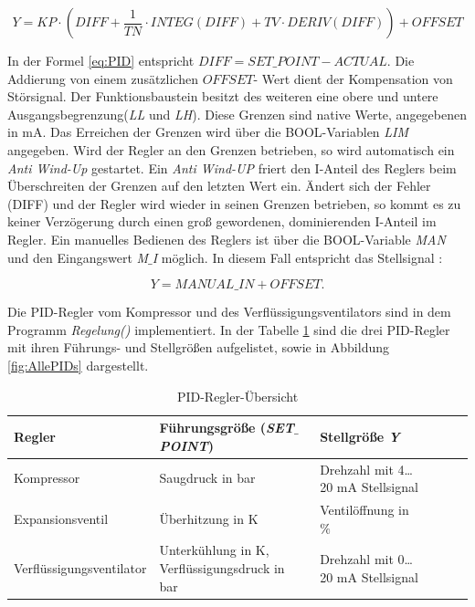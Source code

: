 \begin{equation}
 Y = KP \cdot (DIFF + \frac{1}{TN} \cdot INTEG(DIFF) + TV \cdot DERIV(DIFF)) + OFFSET
 \label{eq:PID}
\end{equation}

In der Formel \ref{eq:PID} entspricht $DIFF = SET\_POINT - ACTUAL$.  Die Addierung von einem zusätzlichen $OFFSET$- Wert dient der Kompensation von Störsignal. Der Funktionsbaustein besitzt des weiteren eine obere und untere Ausgangsbegrenzung(\textit{LL} und \textit{LH}). Diese Grenzen sind native Werte, angegebenen in mA. Das Erreichen der Grenzen wird über die BOOL-Variablen \textit{LIM} angegeben. Wird der Regler an den Grenzen betrieben, so wird automatisch ein \textit{Anti Wind-Up} gestartet. Ein \textit{Anti Wind-UP} friert den I-Anteil des Reglers beim Überschreiten der Grenzen auf den letzten Wert ein. Ändert sich der Fehler (DIFF) und der Regler wird wieder in seinen Grenzen betrieben, so kommt es zu keiner Verzögerung durch einen groß gewordenen, dominierenden I-Anteil im Regler. Ein manuelles Bedienen des Reglers ist über die BOOL-Variable \textit{MAN} und den Eingangswert \textit{M$\_$I} möglich. In diesem Fall entspricht das Stellsignal :

\begin{equation}
Y = MANUAL\_IN + OFFSET. 
\end{equation}


Die PID-Regler vom Kompressor und des Verflüssigungsventilators sind in dem Programm \textit{Regelung()} implementiert.  In der Tabelle \ref{tab:Regler_Uebersicht} sind die drei PID-Regler mit ihren Führungs- und Stellgrößen aufgelistet, sowie in Abbildung \ref{fig:AllePIDs} dargestellt. 


\begin{table}[htb]
\centering
\caption{PID-Regler-Übersicht}\vspace{6pt}
\begin{tabular}{p{3.8cm}p{3.9cm}p{5.3cm}lll} 
\hline 
\textbf{Regler} & \textbf{Führungsgröße (\textit{SET$\_$POINT})} & \textbf{Stellgröße \textit{Y}} \\
\hline 
\hline
Kompressor & Saugdruck in bar & Drehzahl mit 4\dots 20 mA Stellsignal \\ 
\hline 
Expansionsventil & Überhitzung in K & Ventilöffnung in $\%$ \\ 
\hline 
Verflüssigungsventilator & Unterkühlung in K, Verflüssigungsdruck in bar & Drehzahl mit 0\dots20 mA Stellsignal \\ 
\hline 
\hline
\end{tabular} 
\label{tab:Regler_Uebersicht}
\end{table}

